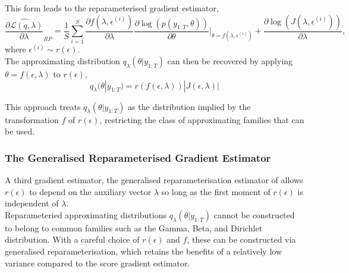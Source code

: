\documentclass[
12pt, %
onehalfspacing, %
nohyperref, %
headsepline, %
chapterinoneline, %
]{MastersDoctoralThesis} %
\begin{document}
This form leads to the reparameterised gradient estimator,
\begin{equation}
\label{SVB:rpDeriv}
\widehat{\frac{\partial\mathcal{L}(q, \lambda)}{\partial \lambda}}_{RP} = \frac{1}{S}  \sum_{i = 1}^S \frac{\partial f(\lambda, \epsilon^{(i)})}{\partial \lambda} \frac{\partial \log(p(y_{1:T}, \theta))}{\partial \theta} \bigg\rvert_{\theta = f(\lambda, \epsilon^{(i)})} + \frac{\partial \log(J(\lambda, \epsilon^{(i)}))}{\partial \lambda}, 
\end{equation}
where $\epsilon^{(i)} \sim r(\epsilon)$. 
\\

The approximating distribution $q_{\lambda}(\theta | y_{1:T})$ can then be recovered by applying $\theta = f(\epsilon, \lambda)$ to $r(\epsilon)$,
\begin{equation}
\label{SVB:rpQ}
q_{\lambda}(\theta | y_{1:T}) = r(f(\epsilon, \lambda)) |J(\epsilon, \lambda)| 
\end{equation}

This approach treats $q_{\lambda}(\theta | y_{1:T})$ as the distribution implied by the transformation $f$ of $r(\epsilon)$, restricting the class of approximating families that can be used. 


\subsubsection{The Generalised Reparameterised Gradient Estimator}
\label{subsubsec:SVBGRP}
A third gradient estimator, the generalised reparameterisation estimator of \citet{Ruiz2016} allows $r(\epsilon)$ to depend on the auxiliary vector $\lambda$ so long as the first moment of $r(\epsilon)$ is independent of $\lambda$. 
\\

Reparameteried approximating distributions $q_{\lambda}(\theta | y_{1:T})$ cannot be constructed to belong to common families such as the Gamma, Beta, and Dirichlet distribution. With a careful choice of $r(\epsilon)$ and $f$, these can be constructed via generalised reparameterisation, which retains the benefits of a relatively low variance compared to the score gradient estimator.
\\
\end{document}
